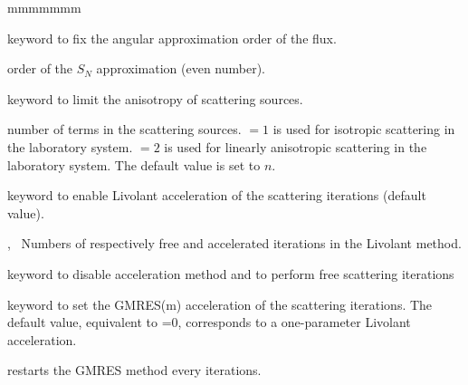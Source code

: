 \begin{ListeDeDescription}{mmmmmmm}
\item[\moc{SN}] keyword to fix the angular approximation order of the flux.

\item[\dusa{n}] order of the $S_N$ approximation (even number).

\item[\moc{SCAT}] keyword to limit the anisotropy of scattering sources.

\item[\dusa{iscat}] number of terms in the scattering sources.  $=1$ is used for
isotropic scattering in the laboratory system.  $=2$ is used for
linearly anisotropic scattering in the laboratory system. The default value is set to $n$.

\item[\moc{LIVO}] keyword to enable Livolant acceleration of the scattering iterations (default value).
\item[\dusa{icl1},~\dusa{icl2}] Numbers of respectively free and accelerated iterations in the Livolant method.
\item[\moc{NLIVO}] keyword to disable acceleration method and to perform free scattering iterations

\item[\moc{GMRES}] keyword to set the GMRES(m) acceleration of the scattering iterations. The default value,
equivalent to =0, corresponds to a one-parameter Livolant acceleration.\cite{gmres}

\item[\dusa{nstart}] restarts the GMRES method every  iterations.


\end{ListeDeDescription}
